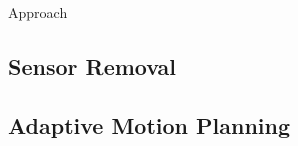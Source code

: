\begin{section}{Approach}
\subsection{Sensor Removal}


\subsection{Adaptive Motion Planning}

	




\end{section} 